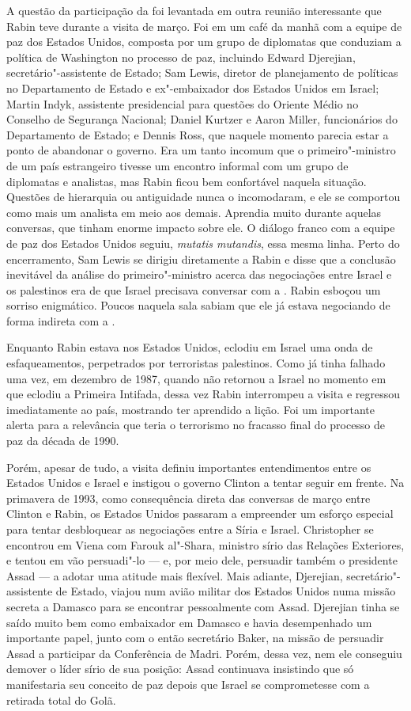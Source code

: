 A questão da participação da  foi levantada em outra reunião
interessante que Rabin teve durante a visita de março. Foi em um café da
manhã com a equipe de paz dos Estados Unidos, composta por um grupo de
diplomatas que conduziam a política de Washington no processo de paz,
incluindo Edward Djerejian, secretário"-assistente de Estado; Sam Lewis,
diretor de planejamento de políticas no Departamento de Estado e
ex"-embaixador dos Estados Unidos em Israel; Martin Indyk, assistente
presidencial para questões do Oriente Médio no Conselho de Segurança
Nacional; Daniel Kurtzer e Aaron Miller, funcionários do Departamento de
Estado; e Dennis Ross, que naquele momento parecia estar a ponto de
abandonar o governo. Era um tanto incomum que o primeiro"-ministro de um
país estrangeiro tivesse um encontro informal com um grupo de diplomatas
e analistas, mas Rabin ficou bem confortável naquela situação. Questões
de hierarquia ou antiguidade nunca o incomodaram, e ele se comportou
como mais um analista em meio aos demais. Aprendia muito durante aquelas
conversas, que tinham enorme impacto sobre ele. O diálogo franco com a
equipe de paz dos Estados Unidos seguiu, \emph{mutatis mutandis}, essa
mesma linha. Perto do encerramento, Sam Lewis se dirigiu diretamente a
Rabin e disse que a conclusão inevitável da análise do primeiro"-ministro
acerca das negociações entre Israel e os palestinos era de que Israel
precisava conversar com a . Rabin esboçou um sorriso enigmático.
Poucos naquela sala sabiam que ele já estava negociando de forma
indireta com a .

Enquanto Rabin estava nos Estados Unidos, eclodiu em Israel uma onda de
esfaqueamentos, perpetrados por terroristas palestinos. Como já tinha
falhado uma vez, em dezembro de 1987, quando não retornou a Israel no
momento em que eclodiu a Primeira Intifada, dessa vez Rabin interrompeu
a visita e regressou imediatamente ao país, mostrando ter aprendido a
lição. Foi um importante alerta para a relevância que teria o terrorismo
no fracasso final do processo de paz da década de 1990.

Porém, apesar de tudo, a visita definiu importantes entendimentos entre
os Estados Unidos e Israel e instigou o governo Clinton a tentar seguir
em frente. Na primavera de 1993, como consequência direta das conversas
de março entre Clinton e Rabin, os Estados Unidos passaram a empreender
um esforço especial para tentar desbloquear as negociações entre a Síria
e Israel. Christopher se encontrou em Viena com Farouk al"-Shara,
ministro sírio das Relações Exteriores, e tentou em vão persuadi"-lo ---
e, por meio dele, persuadir também o presidente Assad --- a adotar uma
atitude mais flexível. Mais adiante, Djerejian, secretário"-assistente de Estado,
viajou num avião militar dos Estados Unidos numa missão
secreta a Damasco para se encontrar pessoalmente com Assad. Djerejian
tinha se saído muito bem como embaixador em Damasco e havia desempenhado
um importante papel, junto com o então secretário Baker, na missão de
persuadir Assad a participar da Conferência de Madri. Porém, dessa vez,
nem ele conseguiu demover o líder sírio de sua posição: Assad continuava
insistindo que só manifestaria seu conceito de paz depois que Israel se
comprometesse com a retirada total do Golã.

